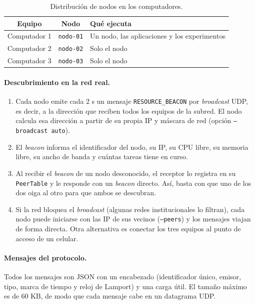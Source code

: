 \documentclass{article}
\begin{document}
\begin{table}[htbp]
\centering
\small
\begin{tabular}{|c|c|p{}|}
\hline
\textbf{Equipo} & \textbf{Nodo} & \textbf{Qué ejecuta} \\ \hline
Computador 1 & \texttt{nodo-01} & Un nodo, las aplicaciones y los experimentos \\ \hline
Computador 2 & \texttt{nodo-02} & Solo el nodo \\ \hline
Computador 3 & \texttt{nodo-03} & Solo el nodo \\ \hline
\end{tabular}
\caption{Distribución de nodos en los computadores.}
\label{tab:tres-pcs}
\end{table}

\paragraph{Descubrimiento en la red real.}
\begin{enumerate}
\item Cada nodo emite cada 2 s un mensaje \texttt{RESOURCE\_BEACON} por \emph{broadcast} UDP, es decir,
a la dirección que reciben todos los equipos de la subred. El nodo calcula esa dirección a partir de
su propia IP y máscara de red (opción \texttt{--broadcast auto}).
\item El \emph{beacon} informa el identificador del nodo, su IP, su CPU libre, su memoria libre, su ancho
de banda y cuántas tareas tiene en curso.
\item Al recibir el \emph{beacon} de un nodo desconocido, el receptor lo registra en su \texttt{PeerTable}
y le responde con un \emph{beacon} directo. Así, basta con que uno de los dos oiga al otro para que
ambos se descubran.
\item Si la red bloquea el \emph{broadcast} (algunas redes institucionales lo filtran), cada nodo puede
iniciarse con las IP de sus vecinos (\texttt{--peers}) y los mensajes viajan de forma directa. Otra
alternativa es conectar los tres equipos al punto de acceso de un celular.
\end{enumerate}

\paragraph{Mensajes del protocolo.}
Todos los mensajes son JSON con un encabezado (identificador único, emisor, tipo, marca de tiempo y
reloj de Lamport) y una carga útil. El tamaño máximo es de 60 KB, de modo que cada mensaje cabe en un
datagrama UDP.
\end{document}
